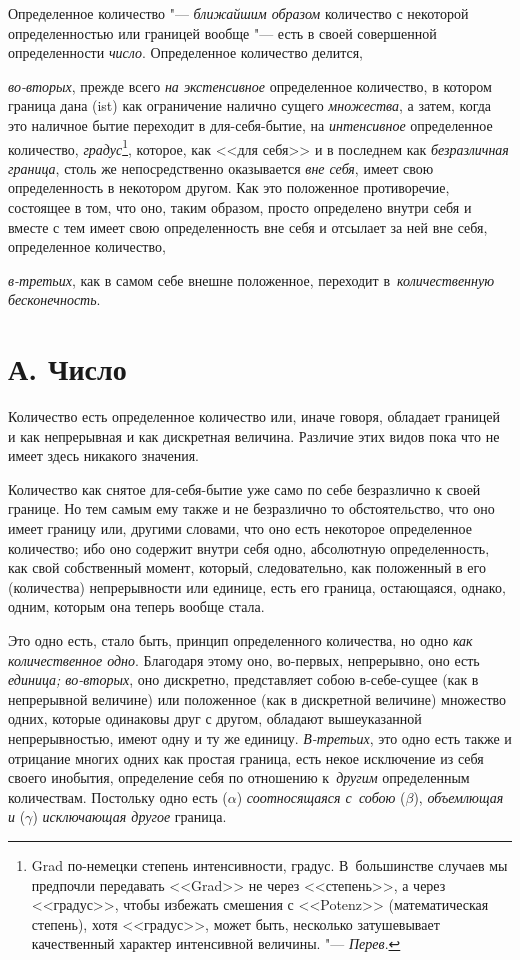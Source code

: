 Определенное количество "--- {\em ближайшим образом} количество с некоторой
определенностью или границей вообще "--- есть в своей совершенной
определенности {\em число}. Определенное количество делится,

{\em во-вторых}, прежде всего {\em на экстенсивное} определенное количество,
в котором граница дана (ist) как ограничение налично сущего {\em множества},
а затем, когда это наличное бытие переходит в для-себя-бытие, на
{\em интенсивное} определенное количество, {\em градус}\footnote{Grad
по-немецки степень интенсивности, градус. В~большинстве случаев мы предпочли
передавать <<Grad>> не через <<степень>>, а через <<градус>>, чтобы избежать
смешения с <<Potenz>> (математическая степень), хотя <<градус>>, может быть,
несколько затушевывает качественный характер интенсивной величины. "---
{\em Перев}.}, которое, как <<для себя>> и в последнем как {\em безразличная
граница}, столь же непосредственно оказывается {\em вне себя}, имеет свою
определенность в некотором другом. Как это положенное противоречие, состоящее
в том, что оно, таким образом, просто определено внутри себя и вместе с тем
имеет свою определенность вне себя и отсылает за ней вне себя, определенное
количество,

{\em в-третьих}, как в самом себе внешне положенное, переходит
в~{\em количественную бесконечность}.

\section[А. Число]{А. Число}

Количество есть определенное количество или, иначе говоря, обладает границей
и как непрерывная и как дискретная величина. Различие этих видов пока что
не имеет здесь никакого значения.

Количество как снятое для-себя-бытие уже само по себе безразлично к своей
границе. Но тем самым ему также и не безразлично то обстоятельство, что оно
имеет границу или, другими словами, что оно есть некоторое определенное
количество; ибо оно содержит внутри себя одно, абсолютную определенность,
как свой собственный момент, который, следовательно, как положенный в его
(количества) непрерывности или единице, есть его граница, остающаяся,
однако, одним, которым она теперь вообще стала.

Это одно есть, стало быть, принцип определенного количества, но одно
{\em как количественное одно}. Благодаря этому оно, во-первых, непрерывно,
оно есть {\em единица; во-вторых}, оно дискретно, представляет собою
в-себе-сущее (как в непрерывной величине) или положенное (как в дискретной
величине) множество одних, которые одинаковы друг с другом, обладают
вышеуказанной непрерывностью, имеют одну и ту же единицу. {\em В-третьих},
это одно есть также и отрицание многих одних как простая граница, есть некое
исключение из себя своего инобытия, определение себя по отношению
к~{\em другим} определенным количествам. Постольку одно есть ($\alpha$)
{\em соотносящаяся с~собою} ($\beta$), {\em объемлющая и} ($\gamma$)
{\em исключающая другое} граница.

